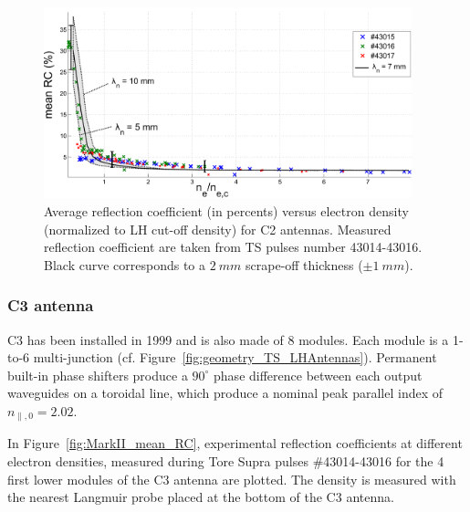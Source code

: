 \begin{figure}[h]
	\centering
	\includegraphics[width=0.95\textwidth]{figures/chap2/Tore_Supra/C2_mean_CR_modBas}
	\caption{Average reflection  coefficient (in percents) versus electron density (normalized to LH cut-off density) for C2 antennas. Measured reflection  coefficient are taken from TS pulses number 43014-43016. Black curve corresponds to a $2~mm$ scrape-off thickness ($\pm 1~mm$).}
	\label{fig:MarkI_mean_RC}
\end{figure}

\subsubsection{C3 antenna}
C3 has been installed in 1999 and is also made of 8 modules. Each module is a 1-to-6 multi-junction (cf. Figure~\ref{fig:geometry_TS_LHAntennas}). Permanent built-in phase shifters produce a $90^\circ$ phase difference between each output waveguides on a toroidal line, which produce a nominal peak parallel index of $n_{\parallel,0}=2.02$.

In Figure~\ref{fig:MarkII_mean_RC}, experimental reflection coefficients at different electron densities, measured during Tore Supra pulses \#43014-43016 for the 4 first lower modules of the C3 antenna are plotted. The density is measured with the nearest Langmuir probe placed at the bottom of the C3 antenna. 

